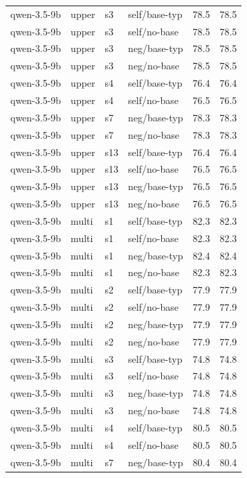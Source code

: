 {\begin{longtable}{llll rr}
qwen-3.5-9b & upper & s3 & self/base-typ & 78.5 & 78.5 \\
qwen-3.5-9b & upper & s3 & self/no-base & 78.5 & 78.5 \\
qwen-3.5-9b & upper & s3 & neg/base-typ & 78.5 & 78.5 \\
qwen-3.5-9b & upper & s3 & neg/no-base & 78.5 & 78.5 \\
qwen-3.5-9b & upper & s4 & self/base-typ & 76.4 & 76.4 \\
qwen-3.5-9b & upper & s4 & self/no-base & 76.5 & 76.5 \\
qwen-3.5-9b & upper & s7 & neg/base-typ & 78.3 & 78.3 \\
qwen-3.5-9b & upper & s7 & neg/no-base & 78.3 & 78.3 \\
qwen-3.5-9b & upper & s13 & self/base-typ & 76.4 & 76.4 \\
qwen-3.5-9b & upper & s13 & self/no-base & 76.5 & 76.5 \\
qwen-3.5-9b & upper & s13 & neg/base-typ & 76.5 & 76.5 \\
qwen-3.5-9b & upper & s13 & neg/no-base & 76.5 & 76.5 \\
\midrule
qwen-3.5-9b & multi & s1 & self/base-typ & 82.3 & 82.3 \\
qwen-3.5-9b & multi & s1 & self/no-base & 82.3 & 82.3 \\
qwen-3.5-9b & multi & s1 & neg/base-typ & 82.4 & 82.4 \\
qwen-3.5-9b & multi & s1 & neg/no-base & 82.3 & 82.3 \\
qwen-3.5-9b & multi & s2 & self/base-typ & 77.9 & 77.9 \\
qwen-3.5-9b & multi & s2 & self/no-base & 77.9 & 77.9 \\
qwen-3.5-9b & multi & s2 & neg/base-typ & 77.9 & 77.9 \\
qwen-3.5-9b & multi & s2 & neg/no-base & 77.9 & 77.9 \\
qwen-3.5-9b & multi & s3 & self/base-typ & 74.8 & 74.8 \\
qwen-3.5-9b & multi & s3 & self/no-base & 74.8 & 74.8 \\
qwen-3.5-9b & multi & s3 & neg/base-typ & 74.8 & 74.8 \\
qwen-3.5-9b & multi & s3 & neg/no-base & 74.8 & 74.8 \\
qwen-3.5-9b & multi & s4 & self/base-typ & 80.5 & 80.5 \\
qwen-3.5-9b & multi & s4 & self/no-base & 80.5 & 80.5 \\
qwen-3.5-9b & multi & s7 & neg/base-typ & 80.4 & 80.4 \\

\end{longtable}}
